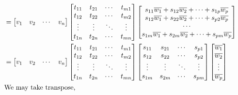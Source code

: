 \begin{commentary}
\begin{align*}
	& = \begin{bmatrix} v_1 & v_2 & \cdots & v_n  \end{bmatrix} \begin{bmatrix} t_{11} & t_{21} & \cdots & t_{m1} \\ t_{12} & t_{22} & \cdots & t_{m2} \\ \vdots & \vdots & \ddots & \vdots \\ t_{1n} & t_{2n} & \cdots & t_{mn} \end{bmatrix} \begin{bmatrix} s_{11}\overline{w_1}+s_{12}\overline{w_2}+\cdots+s_{1p}\overline{w_p} \\ s_{12}\overline{w_1}+s_{22}\overline{w_2}+\cdots+s_{p2}\overline{w_p} \\ \cdots \\ s_{1m}\overline{w_1}+ s_{2m}\overline{w_2}+\cdots+s_{pm}\overline{w_p} \end{bmatrix} \\
	& = \begin{bmatrix} v_1 & v_2 & \cdots & v_n  \end{bmatrix} \begin{bmatrix} t_{11} & t_{21} & \cdots & t_{m1} \\ t_{12} & t_{22} & \cdots & t_{m2} \\ \vdots & \vdots & \ddots & \vdots \\ t_{1n} & t_{2n} & \cdots & t_{mn} \end{bmatrix} \begin{bmatrix} s_{11} & s_{21} & \cdots & s_{p1} \\ s_{12} & s_{22} & \cdots & s_{p2} \\ \vdots & \vdots & \ddots & \vdots \\ s_{1m} & s_{2m} & \cdots & s_{pm} \end{bmatrix} \begin{bmatrix} \overline{w_1} \\ \overline{w_2} \\ \vdots \\ \overline{w_p} \end{bmatrix}\\
	\intertext{We may take transpose,}

\end{align*}
\end{commentary}
